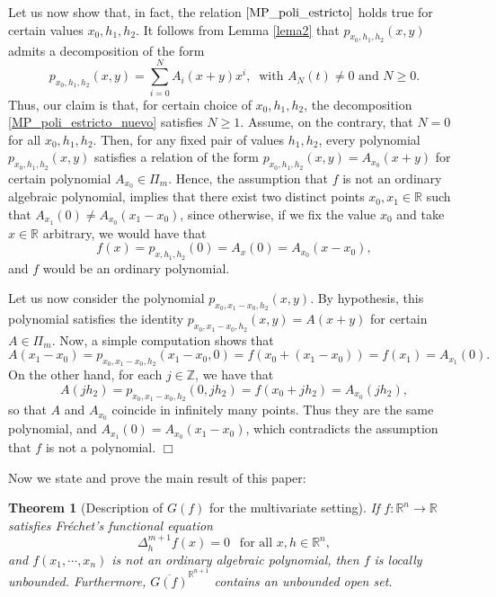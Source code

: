 \documentclass[10pt,a4paper]{amsart}
\newtheorem{theorem}{Theorem}[section]
\theoremstyle{definition}
\begin{document}
Let us now show that, in fact, the relation $\eqref{MP_poli_estricto}$ holds true for certain values $x_0,h_1,h_2$. It follows from Lemma \ref{lema2} that  $p_{x_0,h_1,h_2}(x,y)$ admits a decomposition of the form 
\begin{equation}\label{MP_poli_estricto_nuevo}
p_{x_0,h_1,h_2}(x,y)=\sum_{i=0}^NA_i(x+y)x^i,\ \text{ with } A_N(t)\neq 0 \text{ and } N\geq 0.
\end{equation}
Thus, our claim is that, for certain choice of $x_0,h_1,h_2$, the decomposition \eqref{MP_poli_estricto_nuevo} satisfies $N\geq 1$. Assume, on the contrary, that $N=0$ for all  $x_0,h_1,h_2$. Then, for any fixed pair of values   $h_1,h_2$, every polynomial   $p_{x_0,h_1,h_2}(x,y)$ satisfies a relation of the form $p_{x_0,h_1,h_2}(x,y)=A_{x_0}(x+y)$ for certain polynomial $A_{x_0}\in\Pi_m$. Hence, the assumption that $f$ is not an ordinary algebraic polynomial, implies that there exist two distinct points $x_0,x_1\in\mathbb{R}$ such that  $A_{x_1}(0)\neq A_{x_0}(x_1-x_0)$, since otherwise, if we fix the value $x_0$ and take $x\in\mathbb{R}$ arbitrary, we would have that  
\[
f(x)=p_{x,h_1,h_2}(0)=A_x(0)=A_{x_0}(x-x_0),
\] 
and $f$ would be an ordinary polynomial.  

Let us now consider the polynomial  
 $p_{x_0,x_1-x_0,h_2}(x,y)$. By hypothesis, this polynomial satisfies the identity $p_{x_0,x_1-x_0,h_2}(x,y)=A(x+y)$ for certain $A\in \Pi_m$. Now, a simple computation shows that 
\[
A(x_1-x_0)=p_{x_0,x_1-x_0,h_2}(x_1-x_0,0)=f(x_0+(x_1-x_0))=f(x_1)=A_{x_1}(0).
\]
On the other hand, for each $j\in\mathbb{Z}$, we have that 
\[
A(jh_2)=p_{x_0,x_1-x_0,h_2}(0,jh_2)=f(x_0+jh_2)=A_{x_0}(jh_2),
\]
so that $A$ and $A_{x_0}$ coincide in infinitely many points. Thus they are the same polynomial, and  $A_{x_1}(0)= A_{x_0}(x_1-x_0)$, which contradicts the assumption that $f$ is not a polynomial. 
{\hfill $\Box$}

Now we state and prove the main result of this paper:

\begin{theorem}[Description of  $G(f)$ for the multivariate setting]  \label{MP_grafo_vv} If $f:\mathbb{R}^n\to\mathbb{R}$ satisfies Fr\'{e}chet's functional equation 
\[
\Delta_h^{m+1}f(x)=0 \ \ \text{ for all  }x,h \in\mathbb{R}^n,
\]
and $f(x_1,\cdots,x_n)$ is not an ordinary algebraic polynomial, then  $f$ is locally  unbounded. Furthermore,  $\overline{G(f)}^{\mathbb{R}^{n+1}}$ contains an unbounded open set. 
\end{theorem}
\end{document}
